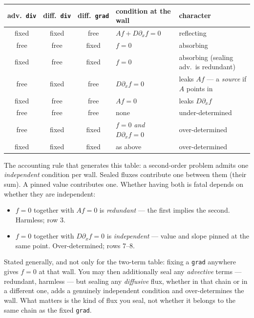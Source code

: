 \documentclass[11pt]{article}
\newcommand{\code}[1]{\texttt{#1}}
\begin{document}
\begin{center}
\begin{tabular}{@{}cccll@{}}
\toprule
adv.\ \code{div} & diff.\ \code{div} & diff.\ \code{grad} & condition at the wall & character \\
\midrule
fixed & fixed & free  & $Af + D\partial_x f = 0$ & reflecting \\
free  & free  & fixed & $f = 0$                  & absorbing \\
fixed & free  & fixed & $f = 0$                  & absorbing (sealing adv.\ is redundant) \\
free  & fixed & free  & $D\partial_x f = 0$      & leaks $Af$ --- a \emph{source} if $A$ points in \\
fixed & free  & free  & $Af = 0$                 & leaks $D\partial_x f$ \\
free  & free  & free  & none                     & under-determined \\
free  & fixed & fixed & $f=0$ \emph{and} $D\partial_x f=0$ & over-determined \\
fixed & fixed & fixed & as above                 & over-determined \\
\bottomrule
\end{tabular}
\end{center}

The accounting rule that generates this table: a second-order problem admits one
\emph{independent} condition per wall. Sealed fluxes contribute one between them
(their sum). A pinned value contributes one. Whether having both is fatal
depends on whether they are independent:

\begin{itemize}\itemsep2pt
\item $f=0$ together with $Af=0$ is \emph{redundant} --- the first implies the
      second. Harmless; row 3.
\item $f=0$ together with $D\partial_x f=0$ is \emph{independent} --- value and
      slope pinned at the same point. Over-determined; rows 7--8.
\end{itemize}

Stated generally, and not only for the two-term table: fixing a \code{grad}
anywhere gives $f=0$ at that wall. You may then additionally seal any
\emph{advective} terms --- redundant, harmless --- but sealing any
\emph{diffusive} flux, whether in that chain or in a different one, adds a
genuinely independent condition and over-determines the wall. What matters is
the kind of flux you seal, not whether it belongs to the same chain as the fixed
\code{grad}.
\end{document}
